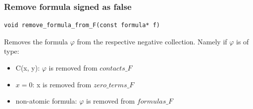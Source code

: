 \documentclass{article}
\begin{document}
	\subsubsection*{Remove formula signed as false}
\begin{lstlisting}
void remove_formula_from_F(const formula* f)
\end{lstlisting}
	Removes the formula $\varphi$ from the respective negative collection. Namely if $\varphi$ is of type:
	\begin{itemize}
		\item C(x, y): $\varphi$ is removed from $contacts\_F$
		\item $x = 0$: x is removed from $zero\_terms\_F$
		\item non-atomic formula: $\varphi$ is removed from $formulas\_F$
	\end{itemize}

	\newpage
\end{document}
